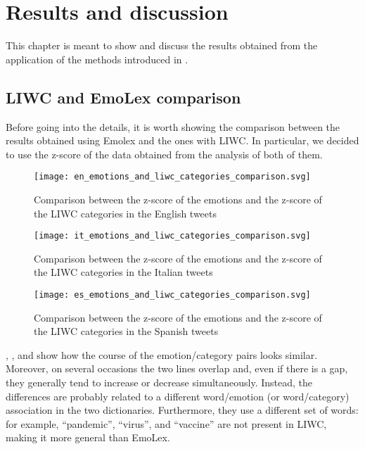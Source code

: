 \graphicspath{{chapters/chapter4/img/}}

\chapter{Results and discussion}
\label{cha:results}

This chapter is meant to show and discuss the results obtained from the application of the methods introduced in .

\section{LIWC and EmoLex comparison}
\label{sec:comparison}

Before going into the details, it is worth showing the comparison between the results obtained using Emolex and the ones with LIWC. In particular, we decided to use the z-score of the data obtained from the analysis of both of them.

\begin{figure}[H]
	\centering
    	\texttt{[image: en\_emotions\_and\_liwc\_categories\_comparison.svg]}
    	\caption{Comparison between the z-score of the emotions and the z-score of the LIWC categories in the English tweets}
    	\label{fig:en-emotions-liwc-comparison}
\end{figure}

\begin{figure}[H]
	\centering
    	\texttt{[image: it\_emotions\_and\_liwc\_categories\_comparison.svg]}
    	\caption{Comparison between the z-score of the emotions and the z-score of the LIWC categories in the Italian tweets}
    	\label{fig:it-emotions-liwc-comparison}
\end{figure}

\begin{figure}[H]
	\centering
    	\texttt{[image: es\_emotions\_and\_liwc\_categories\_comparison.svg]}
    	\caption{Comparison between the z-score of the emotions and the z-score of the LIWC categories in the Spanish tweets}
    	\label{fig:es-emotions-liwc-comparison}
\end{figure}

, , and  show how the course of the emotion/category pairs looks similar. Moreover, on several occasions the two lines overlap and, even if there is a gap, they generally tend to increase or decrease simultaneously. Instead, the differences are probably related to a different word/emotion (or word/category) association in the two dictionaries. Furthermore, they use a different set of words: for example, “pandemic”, “virus”, and “vaccine” are not present in LIWC, making it more general than EmoLex.

